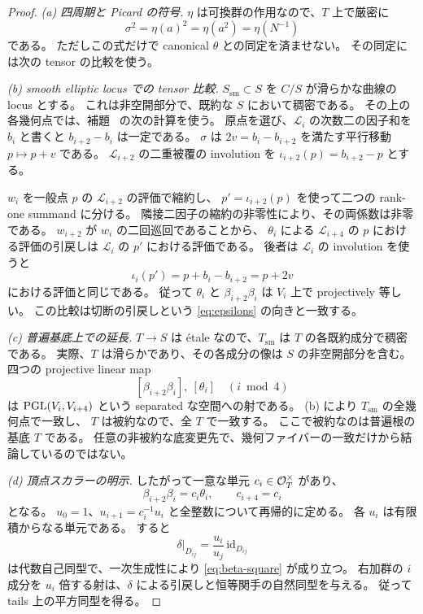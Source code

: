 \begin{proof}
\emph{(a) 四周期と Picard の符号.}
$\eta$ は可換群の作用なので、$T$ 上で厳密に
\[
 \sigma^2=\eta(a)^2=\eta(a^2)=\eta(N^{-1})
 \tag{PR-11}\label{eq:sigma-square}
\]
である。
ただしこの式だけで canonical $\theta$ との同定を済ませない。
その同定には次の tensor の比較を使う。

\emph{(b) smooth elliptic locus での tensor 比較.}
$S_{\mathrm{sm}}\subset S$ を $C/S$ が滑らかな曲線の locus とする。
これは非空開部分で、既約な $S$ において稠密である。
その上の各幾何点では、補題~\cite[\texttt{lem:elliptic-period-square}]{QuadricIntrinsic2026} の次の計算を使う。
原点を選び、$\mathcal L_i$ の次数二の因子和を $b_i$ と書くと
$b_{i+2}-b_i$ は一定である。
$\sigma$ は $2v=b_i-b_{i+2}$ を満たす平行移動 $p\mapsto p+v$ である。
$\mathcal L_{i+2}$ の二重被覆の involution を
$\iota_{i+2}(p)=b_{i+2}-p$ とする。

$w_i$ を一般点 $p$ の $\mathcal L_{i+2}$ の評価で縮約し、
$p'=\iota_{i+2}(p)$ を使って二つの rank-one summand に分ける。
隣接二因子の縮約の非零性により、その両係数は非零である。
$w_{i+2}$ が $w_i$ の二回巡回であることから、
$\theta_i$ による $\mathcal L_{i+4}$ の $p$ における評価の引戻しは
$\mathcal L_i$ の $p'$ における評価である。
後者は $\mathcal L_i$ の involution を使うと
\[
 \iota_i(p')=p+b_i-b_{i+2}=p+2v
\]
における評価と同じである。
従って $\theta_i$ と $\beta_{i+2}\beta_i$ は $V_i$ 上で projectively 等しい。
この比較は切断の引戻しという \eqref{eq:epsilons} の向きと一致する。

\emph{(c) 普遍基底上での延長.}
$T\to S$ は étale なので、$T_{\mathrm{sm}}$ は $T$ の各既約成分で稠密である。
実際、$T$ は滑らかであり、その各成分の像は $S$ の非空開部分を含む。
四つの projective linear map
\[
 [\beta_{i+2}\beta_i],\ [\theta_i]
 \quad(i\bmod4)
\]
は $\operatorname{PGL}(V_i,V_{i+4})$ という separated な空間への射である。
(b) により $T_{\mathrm{sm}}$ の全幾何点で一致し、
$T$ は被約なので、全 $T$ で一致する。
ここで被約なのは普遍根の基底 $T$ である。
任意の非被約な底変更先で、幾何ファイバーの一致だけから結論しているのではない。

\emph{(d) 頂点スカラーの明示.}
したがって一意な単元 $c_i\in\mathcal O_T^\times$ があり、
\[
 \beta_{i+2}\beta_i=c_i\theta_i,
 \qquad c_{i+4}=c_i
\]
となる。
$u_0=1$、$u_{i+1}=c_i^{-1}u_i$ と全整数について再帰的に定める。
各 $u_i$ は有限積からなる単元である。
すると
\[
 \delta|_{D_{ij}}=\frac{u_i}{u_j}\,\mathrm{id}_{D_{ij}}
\]
は代数自己同型で、一次生成性により \eqref{eq:beta-square} が成り立つ。
右加群の $i$ 成分を $u_i$ 倍する射は、$\delta$ による引戻しと恒等関手の自然同型を与える。
従って tails 上の平方同型を得る。


\end{proof}
